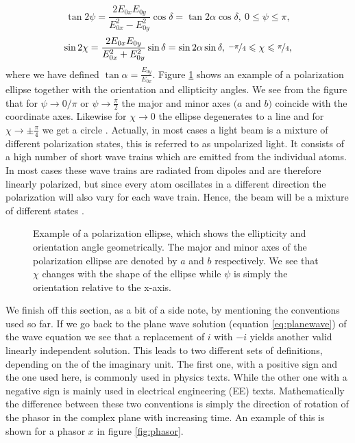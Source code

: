 \begin{equation}
    \label{eq:ellipse_orientation}
    \tan 2\psi = \frac{2E_{0x}E_{0y}}{E_{0x}^2 - E_{0y}^2}\cos \delta = 
    \tan 2\alpha \cos \delta
    ,\: 0\leqslant\psi\leqslant\pi,
\end{equation}
\begin{equation}
    \label{eq:ellipse_ellipticity}
    \sin 2\chi = \frac{2E_{0x}E_{0y}}{E_{0x}^2 + E_{0y}^2}\sin \delta = 
    \sin 2\alpha \sin \delta,\: \nicefrac{-\pi}{4}\leqslant\chi\leqslant\nicefrac{\pi}{4},
\end{equation}
where we have defined $\tan \alpha = \frac{E_{0y}}{E_{0x}}$. Figure \ref{fig:pol_ellipse} shows an example of a polarization ellipse together with the orientation and ellipticity angles. We see from the figure that for $\psi \rightarrow 0/\pi$ or $\psi \rightarrow \frac{\pi}{2}$ the major and minor axes $(a$ and $b)$ coincide with the coordinate axes. Likewise for $\chi \rightarrow 0$ the ellipse degenerates to a line and for $\chi \rightarrow \pm\frac{\pi}{4}$ we get a circle \cite{Collett2009FieldPolarization}. Actually, in most cases a light beam is a mixture of different polarization states, this is referred to as unpolarized light. It consists of a high number of short wave trains which are emitted from the individual atoms. In most cases these wave trains are radiated from dipoles and are therefore linearly polarized, but since every atom oscillates in a different direction the polarization will also vary for each wave train. Hence, the beam will be a mixture of different states \cite{Roth2019Optik}. 

\begin{figure}[h]
    \centering
    
    \caption{Example of a polarization ellipse, which shows the ellipticity and orientation angle geometrically. The major and minor axes of the polarization ellipse are denoted by $a$ and $b$ respectively. We see that $\chi$ changes with the shape of the ellipse while $\psi$ is simply the orientation relative to the x-axis.}
    \label{fig:pol_ellipse}
\end{figure}

We finish off this section, as a bit of a side note, by mentioning the conventions used so far. If we go back to the plane wave solution (equation \ref{eq:planewave}) of the wave equation we see that a replacement of $i$ with $-i$ yields another valid linearly independent solution. This leads to two different sets of definitions, depending on the of the imaginary unit. The first one, with a positive sign and the one used here, is commonly used in physics texts. While the other one with a negative sign is mainly used in electrical engineering (EE) texts. Mathematically the difference between these two conventions is simply the direction of rotation of the phasor in the complex plane with increasing time. An example of this is shown for a phasor $x$ in figure \ref{fig:phasor}. 

